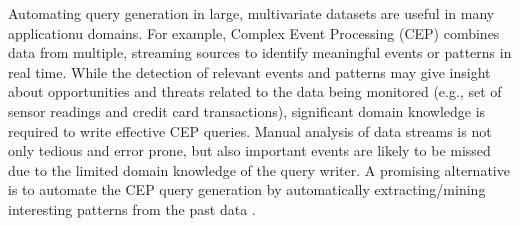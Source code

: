 \documentclass[conference]{IEEEtran}  %
\begin{document}
Automating query generation in large, multivariate datasets are useful in many applicationu domains. For example, Complex Event Processing (CEP) \cite{IEEEexample:CEP} combines data from multiple, streaming sources to identify meaningful events or patterns in real time. While the detection of relevant events and patterns may give insight about opportunities and threats related to the data being monitored (e.g., set of sensor readings and credit card transactions), significant domain knowledge is required to write effective CEP queries. Manual analysis of data streams is not only tedious and error prone, but also important events are likely to be missed due to the limited domain knowledge of the query writer. A promising alternative is to automate the CEP query generation by automatically extracting/mining interesting patterns from the past data \cite{IEEEexample:autoCEP,IEEEexample:TowardsAutomated,IEEEexample:LearningFromThePast}.
\end{document}
